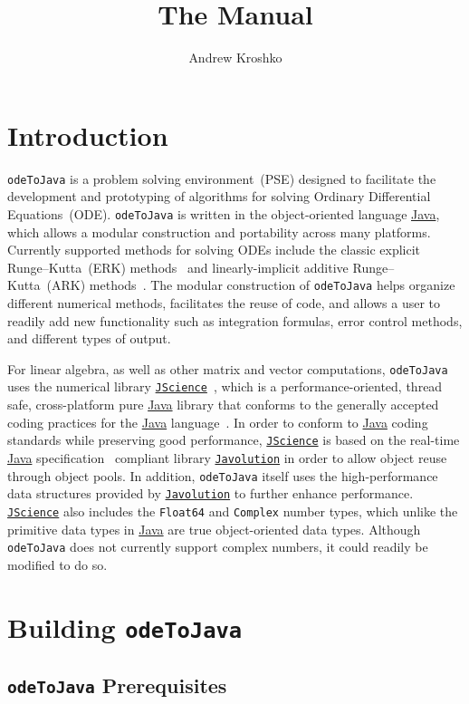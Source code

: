 \documentclass[10pt,letterpaper]{article}
\title{The \odj{} Manual}
\author{Andrew Kroshko}
\date{}
\newcommand\Complex{{\tt Complex}}
\newcommand\Floatsf{{\tt Float64}}
\newcommand\Java{\href{http://www.java.com/en/about/}{\sc Java}}
\newcommand\Javolution{\href{http://javolution.org/}{\tt Javolution}}
\newcommand\JScience{\href{http://jscience.org/}{\tt JScience}}
\newcommand\odj{{\tt odeToJava}}
\begin{document}
\maketitle

\section{Introduction}

\odj{} is a problem solving environment~(PSE) designed to facilitate the
development and prototyping of algorithms for solving Ordinary Differential
Equations~(ODE). \odj{} is written in the object-oriented language \Java, which
allows a modular construction and portability across many platforms. Currently
supported methods for solving ODEs include the classic explicit
Runge--Kutta~(ERK) methods~\cite{HairerNorsettWanner1993} and linearly-implicit
additive Runge--Kutta~(ARK) methods~\cite{AscherRuuthSpiteri1997,
BoscarinoRusso2009, CalvoDefrutosNovo2001, KennedyCarpenter2003}. The modular
construction of \odj{} helps organize different numerical methods, facilitates
the reuse of code, and allows a user to readily add new functionality such as
integration formulas, error control methods, and different types of output.

For linear algebra, as well as other matrix and vector computations, \odj{} uses
the numerical library \JScience~\cite{Martinmichiellot2008}, which is a
performance-oriented, thread safe, cross-platform pure \Java{} library that
conforms to the generally accepted coding practices for the \Java{}
language~\cite{Bloch2008}. In order to conform to \Java{} coding standards while
preserving good performance, \JScience{} is based on the real-time \Java{}
specification~\cite{DibbleBelliardiBrosgolETAL2006} compliant library
\Javolution{} in order to allow object reuse through object pools. In addition,
\odj{} itself uses the high-performance data structures provided by
\Javolution{} to further enhance performance. \JScience{} also includes the
\Floatsf{} and \Complex{} number types, which unlike the primitive data types in
\Java{} are true object-oriented data types. Although \odj{} does not currently
support complex numbers, it could readily be modified to do so.

\section{Building \odj{}}

\subsection{\odj{} Prerequisites}
\end{document}
